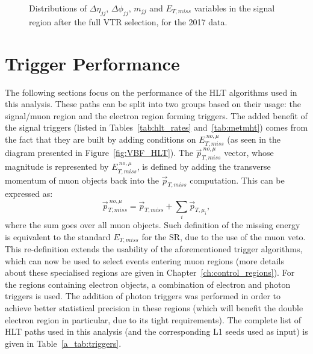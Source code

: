 \begin{figure}[htbp]
{    }
  \caption{Distributions of $\Delta \eta_{jj}$, $\Delta \phi_{jj}$, $m_{jj}$ and $E_{T,miss}$ variables in the signal region after the full VTR selection, for the 2017 data.}
  \label{fig:VTR_SR_2017}
\end{figure}


\section{Trigger Performance}

\hspace{10pt} The following sections focus on the performance of the HLT algorithms used in this analysis. These paths can be split into two groups based on their usage: the signal/muon region and the electron region forming triggers. The added benefit of the signal triggers (listed in Tables~\ref{tab:hlt_rates} and~\ref{tab:metmht}) comes from the fact that they are built by adding conditions on $E_{T, miss}^{~no, \mu}$ (as seen in the diagram presented in Figure~\ref{fig:VBF_HLT}). The $\vec{p}_{T, miss}^{~no, \mu}$ vector, whose magnitude is represented by $E_{T, miss}^{~no, \mu}$, is defined by adding the transverse momentum of muon objects back into the $\vec{p}_{T, miss}$ computation. This can be expressed as:
\begin{equation}
  \vec{p}_{T, miss}^{~no, \mu} = \vec{p}_{T, miss} + \sum_i \vec{p}_{T,\mu_i},
\end{equation}
where the sum goes over all muon objects. Such definition of the missing energy is equivalent to the standard $E_{T, miss}$ for the SR, due to the use of the muon veto. This re-definition extends the usability of the aforementioned trigger algorithms, which can now be used to select events entering muon regions (more details about these specialised regions are given in Chapter~\ref{ch:control_regions}). For the regions containing electron objects, a combination of electron and photon triggers is used. The addition of photon triggers was performed in order to achieve better statistical precision in these regions (which will benefit the double electron region in particular, due to its tight requirements). The complete list of HLT paths used in this analysis (and the corresponding L1 seeds used as input) is given in Table~\ref{a_tab:triggers}.

